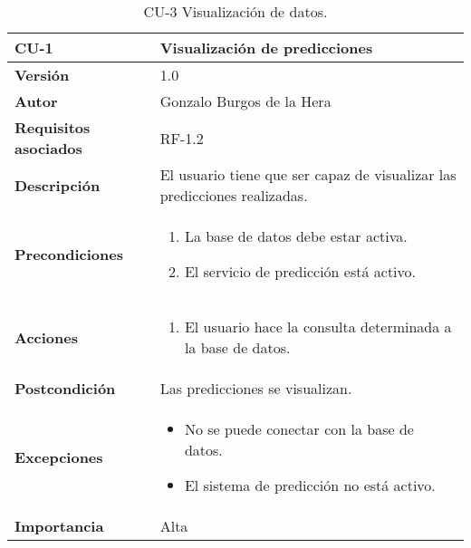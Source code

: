 \begin{table}[H]
	\centering
	\begin{tabularx}{\linewidth}{ p{} p{} }
		\toprule
		\textbf{CU-1}    & \textbf{Visualización de predicciones}\\
		\toprule
		\textbf{Versión}              & 1.0    \\
		\textbf{Autor}                & Gonzalo Burgos de la Hera \\
		\textbf{Requisitos asociados} & RF-1.2 \\
		\textbf{Descripción}          & El usuario tiene que ser capaz de visualizar las predicciones realizadas. \\
		\textbf{Precondiciones}       & 
        \begin{enumerate}
			\def\labelenumi{\arabic{enumi}.}
			\tightlist
			\item La base de datos debe estar activa.
			\item El servicio de predicción está activo.
		\end{enumerate}\\
		\textbf{Acciones}             &
		\begin{enumerate}
			\def\labelenumi{\arabic{enumi}.}
			\tightlist
			\item El usuario hace la consulta determinada a la base de datos.
		\end{enumerate}\\
		\textbf{Postcondición}        & Las predicciones se visualizan. \\
		\textbf{Excepciones}          & 
        \begin{itemize}
			\tightlist
			\item No se puede conectar con la base de datos.
			\item El sistema de predicción no está activo.
        \end{itemize} \\
		\textbf{Importancia}          & Alta \\
		\bottomrule
	\end{tabularx}
	\caption{CU-3 Visualización de datos.}
\end{table}


